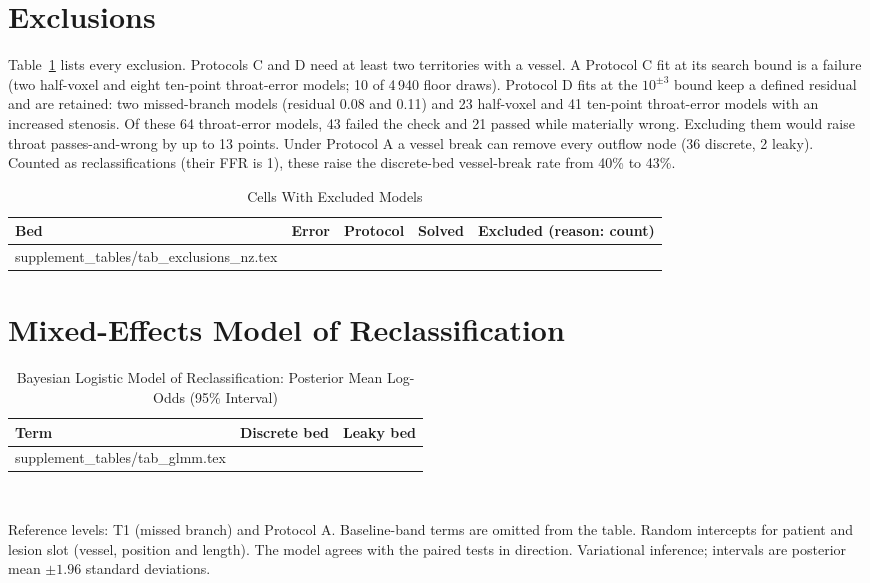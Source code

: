 \documentclass[journal,twoside,web,onecolumn]{ieeecolor}
\begin{document}
\FloatBarrier
{}
\section{Exclusions}\label{sec:excl}
Table~\ref{tab:excl} lists every exclusion. Protocols C and D need at least two territories with a vessel. A Protocol C fit at its search bound is a failure (two half-voxel and eight ten-point throat-error models; 10 of 4\,940 floor draws). Protocol D fits at the $10^{\pm 3}$ bound keep a defined residual and are retained: two missed-branch models (residual 0.08 and 0.11) and 23 half-voxel and 41 ten-point throat-error models with an increased stenosis. Of these 64 throat-error models, 43 failed the check and 21 passed while materially wrong. Excluding them would raise throat passes-and-wrong by up to 13 points. Under Protocol A a vessel break can remove every outflow node (36 discrete, 2 leaky). Counted as reclassifications (their FFR is 1), these raise the discrete-bed vessel-break rate from 40\% to 43\%.
\begin{table}[!ht]
\caption{Cells With Excluded Models}\label{tab:excl}
\centering\footnotesize
\begin{tabular}{@{}lllrl@{}}
\toprule
Bed & Error & Protocol & Solved & Excluded (reason: count)\\
\midrule
{} supplement_tables/tab_exclusions_nz.tex 
\bottomrule
\end{tabular}
\end{table}

\FloatBarrier
{}
\section{Mixed-Effects Model of Reclassification}
\begin{table}[!ht]
\caption{Bayesian Logistic Model of Reclassification: Posterior Mean Log-Odds (95\% Interval)}\label{tab:glmm}
\centering\footnotesize
\begin{tabular}{@{}lcc@{}}
\toprule
Term & Discrete bed & Leaky bed\\
\midrule
{} supplement_tables/tab_glmm.tex 
\bottomrule
\end{tabular}
\\[3pt]
\parbox{0.85\textwidth}{\footnotesize Reference levels: T1 (missed branch) and Protocol A. Baseline-band terms are
omitted from the table. Random intercepts for patient and lesion slot (vessel, position and length). The model agrees with the paired tests in direction. Variational inference; intervals are posterior mean $\pm 1.96$ standard deviations.}
\end{table}
\end{document}
